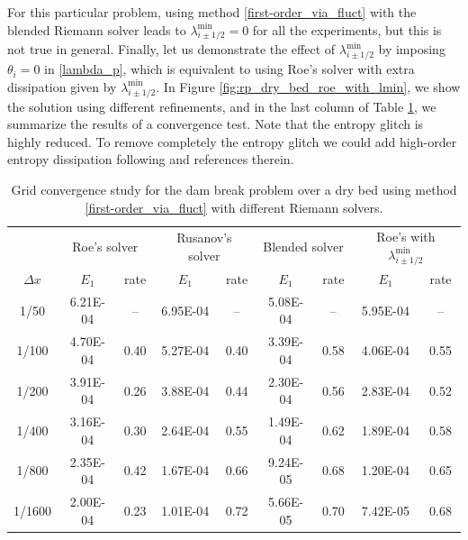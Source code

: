 \documentclass[preprint, 11pt]{article}
\begin{document}
For this particular problem, using method \eqref{first-order_via_fluct} with the blended Riemann solver
leads to $\lambda_{i\pm 1/2}^{\min}=0$ for all the experiments, but this is not true in general.
Finally, let us demonstrate the effect of $\lambda_{i\pm 1/2}^{\min}$ by imposing $\theta_{i}=0$ in \eqref{lambda_p},
which is equivalent to using Roe's solver with extra dissipation given by $\lambda_{i\pm 1/2}^{\min}$.
In Figure \ref{fig:rp_dry_bed_roe_with_lmin}, we show the solution using different refinements,
and in the last column of Table \ref{table:rp_dry_bed}, we summarize the results of a convergence test.
Note that the entropy glitch is highly reduced.
To remove completely the entropy glitch we could add high-order entropy dissipation following \cite{tadmor2003entropy}
and references therein.

\begin{table}[!ht]\scriptsize
  \begin{center}
    \begin{tabular}{||c||c|c||c|c||c|c||c|c||} \hline
      & \multicolumn{2}{c||}{Roe's solver}
      &\multicolumn{2}{c||}{Rusanov's solver}
      &\multicolumn{2}{c||}{Blended solver}
      &\multicolumn{2}{c||}{Roe's with $\lambda_{i\pm 1/2}^{\min}$} \\ \cline{2-9}
      $\Delta x$ & $E_1$ & rate & $E_1$ & rate & $E_1$ & rate & $E_1$ & rate \\ \hline
      1/50   & 6.21E-04 &  --  & 6.95E-04 &   -- & 5.08E-04 & --   & 5.95E-04 & --   \\
      1/100  & 4.70E-04 & 0.40 & 5.27E-04 & 0.40 & 3.39E-04 & 0.58 & 4.06E-04 & 0.55 \\
      1/200  & 3.91E-04 & 0.26 & 3.88E-04 & 0.44 & 2.30E-04 & 0.56 & 2.83E-04 & 0.52 \\
      1/400  & 3.16E-04 & 0.30 & 2.64E-04 & 0.55 & 1.49E-04 & 0.62 & 1.89E-04 & 0.58 \\
      1/800  & 2.35E-04 & 0.42 & 1.67E-04 & 0.66 & 9.24E-05 & 0.68 & 1.20E-04 & 0.65 \\
      1/1600 & 2.00E-04 & 0.23 & 1.01E-04 & 0.72 & 5.66E-05 & 0.70 & 7.42E-05 & 0.68 \\ \hline
    \end{tabular}
    \caption{Grid convergence study for the dam break problem over a dry bed
      using method \eqref{first-order_via_fluct} with different Riemann solvers.\label{table:rp_dry_bed}}
  \end{center}
\end{table}
\end{document}
